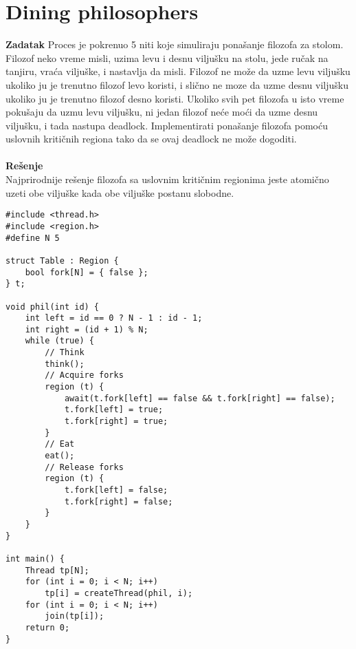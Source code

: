 \clearpage
\section{\latin Dining philosophers}
\textbf{\large Zadatak} Proces je pokrenuo 5 niti koje simuliraju pona\v{s}anje filozofa za stolom. Filozof neko vreme misli, uzima levu i desnu vilju\v{s}ku na stolu, jede ru\v{c}ak na tanjiru, vra\'{c}a vilju\v{s}ke, i nastavlja da misli. Filozof ne mo\v{z}e da uzme levu vilju\v{s}ku ukoliko ju je trenutno filozof levo koristi, i sli\v{c}no ne mo{z}e da uzme desnu vilju\v{s}ku ukoliko ju je trenutno filozof desno koristi. Ukoliko svih pet filozofa u isto vreme poku\v{s}aju da uzmu levu vilju\v{s}ku, ni jedan filozof ne\'{c}e mo\'{c}i da uzme desnu vilju\v{s}ku, i tada nastupa deadlock. Implementirati pona\v{s}anje filozofa pomo\'{c}u uslovnih kriti\v{c}nih regiona tako da se ovaj deadlock ne mo\v{z}e dogoditi.
\\\\
\textbf{\large Re\v{s}enje}\\
Najprirodnije re\v{s}enje filozofa sa uslovnim kriti\v{c}nim regionima jeste atomi\v{c}no uzeti obe vilju\v{s}ke kada obe vilju\v{s}ke postanu slobodne. 
\begin{lstlisting}
#include <thread.h>
#include <region.h>
#define N 5

struct Table : Region {
    bool fork[N] = { false };
} t;

void phil(int id) {
    int left = id == 0 ? N - 1 : id - 1;
    int right = (id + 1) % N;
    while (true) {
        // Think
        think();
        // Acquire forks
        region (t) {
            await(t.fork[left] == false && t.fork[right] == false);
            t.fork[left] = true;
            t.fork[right] = true;
        }
        // Eat
		eat();
        // Release forks
        region (t) {
            t.fork[left] = false;
            t.fork[right] = false;
        }
    }
}

int main() {
    Thread tp[N];
    for (int i = 0; i < N; i++) 
        tp[i] = createThread(phil, i);
    for (int i = 0; i < N; i++) 
        join(tp[i]);
    return 0;
}
\end{lstlisting}